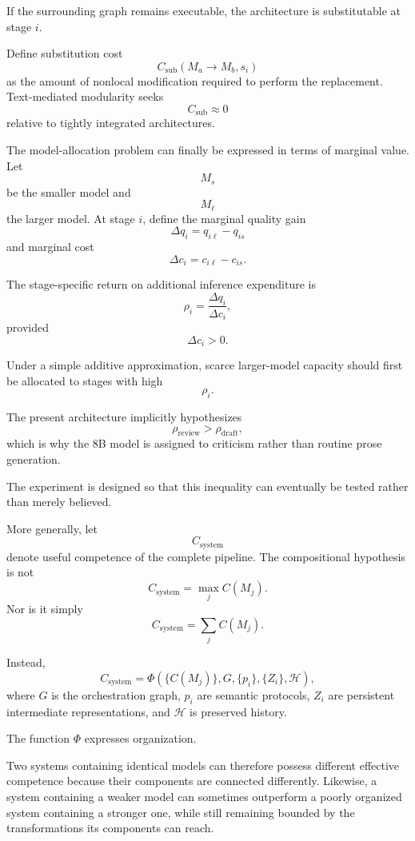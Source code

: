 \documentclass[11pt]{article}
\begin{document}
If the surrounding graph remains executable, the architecture is substitutable at stage \(i\).

Define substitution cost
\[
    C_{\mathrm{sub}}(M_a\rightarrow M_b,s_i)
\]
as the amount of nonlocal modification required to perform the replacement. Text-mediated modularity seeks
\[
    C_{\mathrm{sub}}\approx0
\]
relative to tightly integrated architectures.

The model-allocation problem can finally be expressed in terms of marginal value. Let
\[
    M_s
\]
be the smaller model and
\[
    M_\ell
\]
the larger model. At stage \(i\), define the marginal quality gain
\[
    \Delta q_i
    =
    q_{i\ell}-q_{is}
\]
and marginal cost
\[
    \Delta c_i
    =
    c_{i\ell}-c_{is}.
\]

The stage-specific return on additional inference expenditure is
\[
    \rho_i
    =
    \frac{\Delta q_i}
         {\Delta c_i},
\]
provided
\[
    \Delta c_i>0.
\]

Under a simple additive approximation, scarce larger-model capacity should first be allocated to stages with high
\[
    \rho_i.
\]

The present architecture implicitly hypothesizes
\[
    \rho_{\mathrm{review}}
    >
    \rho_{\mathrm{draft}},
\]
which is why the 8B model is assigned to criticism rather than routine prose generation.

The experiment is designed so that this inequality can eventually be tested rather than merely believed.

More generally, let
\[
    C_{\mathrm{system}}
\]
denote useful competence of the complete pipeline. The compositional hypothesis is not
\[
    C_{\mathrm{system}}
    =
    \max_j C(M_j).
\]
Nor is it simply
\[
    C_{\mathrm{system}}
    =
    \sum_j C(M_j).
\]

Instead,
\[
    C_{\mathrm{system}}
    =
    \Phi
    \left(
        \{C(M_j)\},
        G,
        \{p_i\},
        \{Z_i\},
        \mathcal{H}
    \right),
\]
where \(G\) is the orchestration graph, \(p_i\) are semantic protocols, \(Z_i\) are persistent intermediate representations, and \(\mathcal{H}\) is preserved history.

The function \(\Phi\) expresses organization.

Two systems containing identical models can therefore possess different effective competence because their components are connected differently. Likewise, a system containing a weaker model can sometimes outperform a poorly organized system containing a stronger one, while still remaining bounded by the transformations its components can reach.
\end{document}
